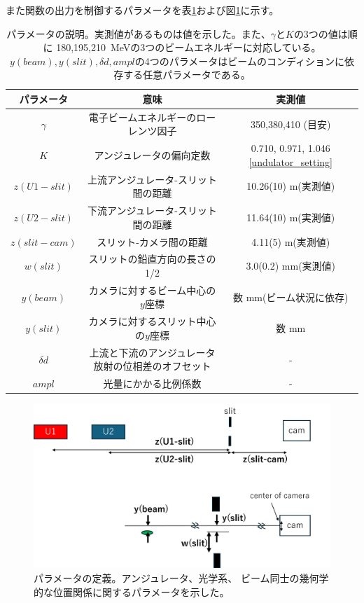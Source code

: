 \documentclass[a4paper,11pt,uplatex]{jsbook}
\begin{document}
また関数の出力を制御するパラメータを表\ref{tab:prm}および図\ref{prm}に示す。
\begin{table}[h]
  \centering
  \begin{tabular}{c|c|c}
    パラメータ & 意味 & 実測値\\ \hline 
    $\gamma$ & 電子ビームエネルギーのローレンツ因子 & 350,380,410 (目安)\\
    $K$ & アンジュレータの偏向定数 & 0.710, 0.971, 1.046 \ref{undulator_setting}\\
    $z(U1-slit)$ & 上流アンジュレータ-スリット間の距離 & 10.26(10) m(実測値)\\
    $z(U2-slit)$ & 下流アンジュレータ-スリット間の距離 & 11.64(10) m(実測値)\\
    $z(slit-cam)$ & スリット-カメラ間の距離 & 4.11(5) m(実測値)\\
    $w(slit)$ & スリットの鉛直方向の長さの1/2 & 3.0(0.2) mm(実測値)\\
    $y(beam)$ & カメラに対するビーム中心の$y$座標 & 数 mm(ビーム状況に依存)\\
    $y(slit)$ & カメラに対するスリット中心の$y$座標 & 数 mm\\
    $\delta d$ & 上流と下流のアンジュレータ放射の位相差のオフセット &  -\\
    $ampl$ & 光量にかかる比例係数 & - 
  \end{tabular}
  \caption[パラメータの説明]{パラメータの説明。実測値があるものは値を示した。また、$\gamma$と$K$の3つの値は順に
  180,195,210~MeVの3つのビームエネルギーに対応している。$y(beam),y(slit),\delta d, ampl$の4つのパラメータはビームのコンディションに依存する任意パラメータである。}\label{tab:prm}
\end{table}
  
\begin{figure}[h]
  \centering
  \includegraphics[width=0.8\linewidth]{image/4-prm.png}
  \caption[パラメータの定義]{パラメータの定義。アンジュレータ、光学系、
  ビーム同士の幾何学的な位置関係に関するパラメータを示した。}\label{prm}
\end{figure}
\end{document}
